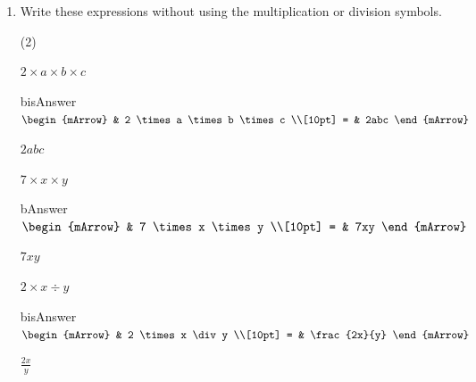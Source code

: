 \clearpage\noindent%
\begin{enumerate}[resume]
  \item Write these expressions without using the multiplication or division symbols.
  \begin{subtask}(2)
    \task[] \begin{exercise} $ 2 \times a \times b \times c$
               \begin{envOut}[height=3cm]{bisAnswer}
			       $\begin{mArrow}
			                & 2 \times a \times b \times c      \\[10pt]
                          = & 2abc	   
	                \end{mArrow}$
               \end{envOut}			  
			  \begin{shortsolution}  
				       $2abc$
			  \end{shortsolution}
		    \end{exercise}

    \task[]  $ 7 \times x \times y $
              \begin{envOut}[height=3cm]{bAnswer}
			       $\begin{mArrow}
			                & 7 \times x \times y      \\[10pt]
                          = & 7xy	   
	                \end{mArrow}$
              \end{envOut}			  
			  \begin{exercise}\begin{shortsolution}  
				       $7xy$
			  \end{shortsolution}\end{exercise}

    \task[]  $ 2 \times x \div y $
              \begin{envOut}[height=3cm]{bisAnswer}
			       $\begin{mArrow}
			                & 2 \times x \div y      \\[10pt]
                          = & \frac{2x}{y}	   
	                \end{mArrow}$
              \end{envOut}			  
			  \begin{exercise}\begin{shortsolution}  
				       $\frac{2x}{y}$
			  \end{shortsolution}\end{exercise}


\end{subtask}
\end{enumerate}

